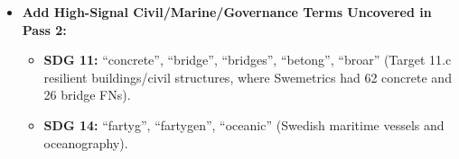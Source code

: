 \begin{itemize}
\begin{itemize}
    \item \textbf{SDG 16 (\enquote{förvaltning}: 9 FP vs. 0 TP; \enquote{administrative}: 14 FP vs. 4 TP):}\\    
    Remove bare \enquote{förvaltning} and \enquote{administrative} (keep \enquote{offentlig förvaltning} and \enquote{public administration}).
    \end{itemize}

    \item \textbf{Add High-Signal Civil/Marine/Governance Terms Uncovered in Pass 2:}
    \begin{itemize}
    \item \textbf{SDG 11:} \enquote{concrete}, \enquote{bridge}, \enquote{bridges}, \enquote{betong}, \enquote{broar} (Target 11.c resilient buildings/civil structures, where Swemetrics had \num{62} concrete and \num{26} bridge FNs).


    \item \textbf{SDG 14:} \enquote{fartyg}, \enquote{fartygen}, \enquote{oceanic} (Swedish maritime vessels and oceanography).
    \end{itemize}
\end{itemize}

